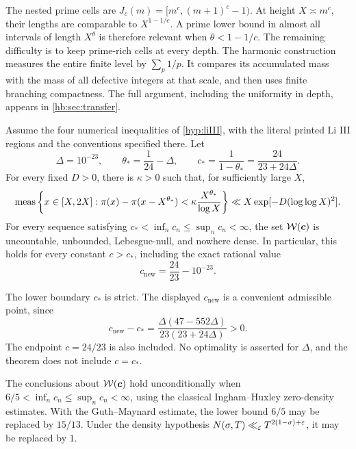The nested prime cells are
$J_c(m)=[m^c,(m+1)^c-1)$.
At height $X\asymp m^c$, their lengths are comparable to
$X^{1-1/c}$. A prime lower bound in almost all intervals of length
$X^\theta$ is therefore relevant when $\theta<1-1/c$.
The remaining difficulty is to keep prime-rich cells at every depth.
The harmonic construction measures the entire finite level by
$\sum_p1/p$. It compares its accumulated mass with the mass of all
defective integers at that scale, and then uses finite branching
compactness. The full argument, including the uniformity in depth,
appears in \cref{hb:sec:transfer}.

\begin{theorem}\label{thm:main}
Assume the four numerical inequalities of \cref{hyp:liIII}, with the
literal printed Li III regions and the conventions specified there.
Let
\[
 \Delta=10^{-23},\qquad
 \theta_* =\frac1{24}-\Delta,\qquad
 c_* =\frac{1}{1-\theta_*}=\frac{24}{23+24\Delta}.
\]
For every fixed $D>0$, there is $\kappa>0$ such that, for sufficiently
large $X$,
\begin{equation}\label{eq:main:prime}
 \operatorname{meas}\left\{x\in[X,2X]:
 \pi(x)-\pi(x-X^{\theta_*})
 <\kappa\frac{X^{\theta_*}}{\log X}\right\}
 \ll X\exp[-D(\log\log X)^2].
\end{equation}
For every sequence satisfying
$c_*<\inf_n c_n\le\sup_n c_n<\infty$,
the set $\mathcal W(\boldsymbol c)$ is uncountable, unbounded,
Lebesgue-null, and nowhere dense. In particular, this holds for every
constant $c>c_*$, including the exact rational value
\[
                   \boxed{c_{\mathrm{new}}=\frac{24}{23}-10^{-23}}.
\]
\end{theorem}

The lower boundary $c_*$ is strict. The displayed $c_{\mathrm{new}}$
is a convenient admissible point, since
\begin{equation}\label{eq:intro:exactgap}
 c_{\mathrm{new}}-c_*
 =\frac{\Delta(47-552\Delta)}{23(23+24\Delta)}>0.
\end{equation}
The endpoint $c=24/23$ is also included. No optimality is asserted for
$\Delta$, and the theorem does not include $c=c_*$.

\begin{theorem}\label{thm:baseline}
The conclusions about $\mathcal W(\boldsymbol c)$ hold unconditionally when
$6/5<\inf_n c_n\le\sup_n c_n<\infty$, using the classical
Ingham--Huxley zero-density estimates. With the Guth--Maynard estimate,
the lower bound $6/5$ may be replaced by $15/13$.
Under the density hypothesis
$N(\sigma,T)\ll_\varepsilon T^{2(1-\sigma)+\varepsilon}$, it may be replaced by $1$.
\end{theorem}

